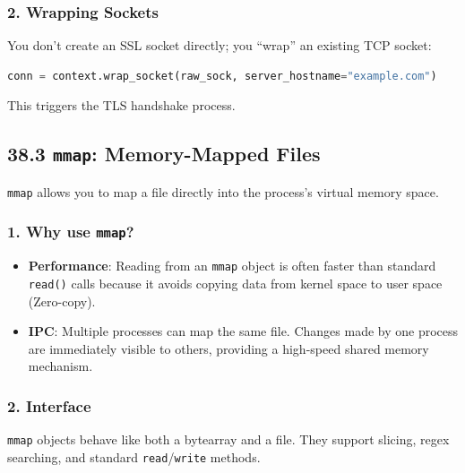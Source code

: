\hypertarget{wrapping-sockets}{%
\subsubsection{2. Wrapping Sockets}\label{wrapping-sockets}}

You don't create an SSL socket directly; you ``wrap'' an existing TCP
socket:

\begin{lstlisting}[language=Python]
conn = context.wrap_socket(raw_sock, server_hostname="example.com")
\end{lstlisting}

This triggers the TLS handshake process.

\hypertarget{mmap-memory-mapped-files}{%
\subsection{\texorpdfstring{38.3 \texttt{mmap}: Memory-Mapped
Files}{38.3 mmap: Memory-Mapped Files}}\label{mmap-memory-mapped-files}}

\passthrough{\lstinline!mmap!} allows you to map a file directly into
the process's virtual memory space.

\hypertarget{why-use-mmap}{%
\subsubsection{\texorpdfstring{1. Why use
\texttt{mmap}?}{1. Why use mmap?}}\label{why-use-mmap}}

\begin{itemize}
\tightlist
\item
  \textbf{Performance}: Reading from an \passthrough{\lstinline!mmap!}
  object is often faster than standard \passthrough{\lstinline!read()!}
  calls because it avoids copying data from kernel space to user space
  (Zero-copy).
\item
  \textbf{IPC}: Multiple processes can map the same file. Changes made
  by one process are immediately visible to others, providing a
  high-speed shared memory mechanism.
\end{itemize}

\hypertarget{interface}{%
\subsubsection{2. Interface}\label{interface}}

\passthrough{\lstinline!mmap!} objects behave like both a bytearray and
a file. They support slicing, regex searching, and standard
\passthrough{\lstinline!read!}/\passthrough{\lstinline!write!} methods.

